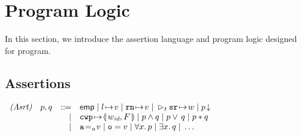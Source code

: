 \section{Program Logic}
\label{sec:logic}

In this section,
we introduce the assertion language
and program logic designed for \sparc{} program.

\subsection{Assertions}
\label{subsec:assertions}

\begin{center}
	$
		\begin{array}{rrcl}
			\textit{(Asrt)} & \astP, \astQ & \define & 
			\aemp \sepline
			\msto{l}{\val} \sepline
			\regst{\regN}{\val} \sepline
			\dlyregst{t}{\sr}{\word} \sepline 
			\asrttm{p} \\
			& & \ \ \ | &
			\frmst{\cwp}{F} \sepline
			\astP \wedge \astQ \sepline
			\astP \vee \, \astQ \sepline
			\astP \sepstar \astQ \\
			& & \ \ \ | &
			\aexp \addrEq \val \sepline
			\oexp = \val \sepline
			\forall x. \, \astP \sepline
			\exists x. \, \astQ \sepline
            \dots 
		\end{array}
	$
	\label{fig:Syntax of Assertions}
	\vspace{-0.5em}
\end{center}



